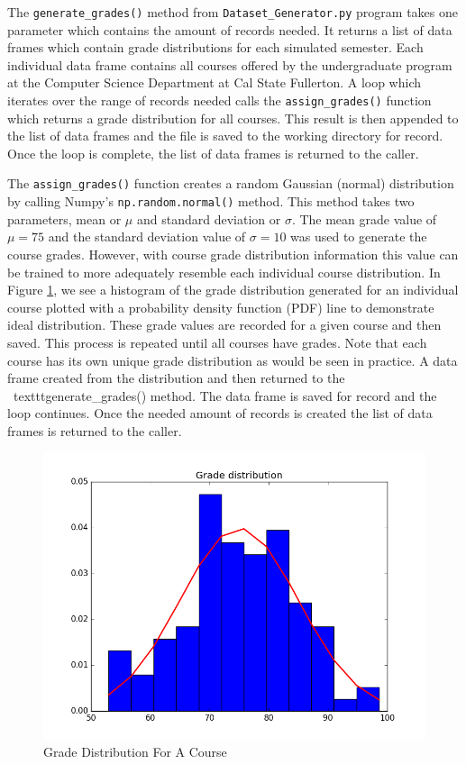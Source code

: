 \documentclass[12pt]{article}
\begin{document}
The \texttt{generate\_grades()} method from \texttt{Dataset\_Generator.py} program takes one parameter 
which contains the amount of records needed. It returns a list of data frames which contain grade distributions 
for each simulated semester. Each individual data frame contains all courses offered by the undergraduate 
program at the Computer Science Department at Cal State Fullerton. A loop which iterates over the range of
records needed calls the \texttt{assign\_grades()} function which returns a grade distribution for all courses. 
This result is then appended to the list of data frames and the file is saved to the working directory for record. 
Once the loop is complete, the list of data frames is returned to the caller.

The \texttt{assign\_grades()} function creates a random Gaussian (normal) distribution by calling Numpy's 
\texttt{np.random.normal()} method. This method takes two parameters, mean or $\mu$ and standard deviation or 
$\sigma$. The mean grade value of $\mu=75$ and the standard 
deviation value of $\sigma=10$ was used to generate the course grades. However, with course grade distribution 
information this value can be trained to more adequately resemble each individual course distribution. In Figure 
\ref{fig:fig1}, we see a histogram of the grade distribution generated for an individual course plotted with a probability
density function (PDF) line to demonstrate ideal distribution. These grade values are recorded for a given course 
and then saved. This process is repeated until all courses have grades. Note that each course has its own unique 
grade distribution as would be seen in practice. A data frame created from the distribution and then returned to the \
texttt{generate\_grades()} method. The data frame is saved for record and the loop continues. Once the needed 
amount of records is created the list of data frames is returned to the caller.

\begin{figure}
    \centering
    \includegraphics[scale=0.50]{GradeDistribution}
    \caption{Grade Distribution For A Course}
    \label{fig:fig1}
\end{figure}
\end{document}
